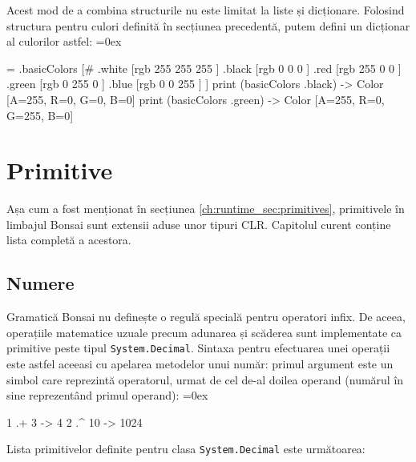 \documentclass[12pt,a4paper]{memoir}
\renewcommand{\c}{\texttt}
\newenvironment{code}
{
\definecolor{shadecolor}{gray}{0.91}
\topsep=0ex
\relax
\shaded
\verbatim
}
{
\endverbatim
\endshaded
}
\begin{document}
Acest mod de a combina structurile nu este limitat la liste și dicționare. Folosind structura pentru culori definită în secțiunea precedentă, putem defini un dicționar al culorilor astfel:
\begin{code}
= .basicColors [#
  .white [rgb 255 255 255 ]
  .black [rgb 0 0 0 ]
  .red [rgb 255 0 0 ]
  .green [rgb 0 255 0 ]
  .blue [rgb 0 0 255 ]
]
print (basicColors .black)
  -> Color [A=255, R=0, G=0, B=0]
print (basicColors .green)
  -> Color [A=255, R=0, G=255, B=0]
\end{code}

\chapter{Primitive}\label{ch:Primitives}

Așa cum a fost menționat în secțiunea \ref{ch:runtime_sec:primitives}, primitivele în limbajul Bonsai sunt extensii aduse unor tipuri CLR. Capitolul curent conține lista completă a acestora.

\section{Numere}

Gramatică Bonsai nu definește o regulă specială pentru operatori infix. De aceea, operațiile matematice uzuale precum adunarea și scăderea sunt implementate ca primitive peste tipul \c{System.Decimal}. Sintaxa pentru efectuarea unei operații este astfel aceeasi cu apelarea metodelor unui număr: primul argument este un simbol care reprezintă operatorul, urmat de cel de-al doilea operand (numărul în sine reprezentând primul operand):
\begin{code}
1 .+ 3 
  -> 4
2 .^ 10
  -> 1024
\end{code}

Lista primitivelor definite pentru clasa \c{System.Decimal} este următoarea:
\end{document}
